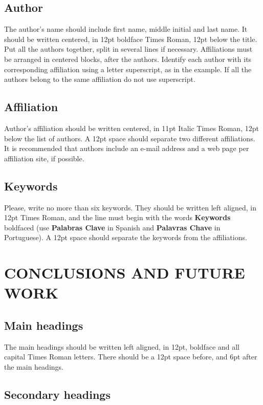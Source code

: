 \documentclass[oneside,a4paper,english,links]{amca}
\begin{document}
\subsection{Author}

The author's name should include first name, middle initial and last
name. It should be written centered, in 12pt boldface Times Roman,
12pt below the title. Put all the authors together, split in several
lines if necessary. Affiliations must be arranged in centered blocks,
after the authors. Identify each author with its corresponding
affiliation using a letter superscript, as in the example. If all the
authors belong to the same affiliation do not use superscript. 

\subsection{Affiliation}

Author's affiliation should be written centered, in 11pt Italic Times Roman,
12pt below the list of authors. A 12pt space should separate two
different affiliations. It is recommended that authors include an
e-mail address and a web page per affiliation site, if possible. 

\subsection{Keywords}

Please, write no more than six keywords.  They should be written left
aligned, in 12pt Times Roman, and the line must begin with the words
{\bf Keywords} boldfaced (use {\bf Palabras Clave} in Spanish and {\bf
Palavras Chave} in Portuguese). A 12pt space should separate the
keywords from the affiliations.

\section{CONCLUSIONS AND FUTURE WORK}

\subsection{Main headings}

The main headings should be written left aligned, in 12pt, boldface
and all capital Times Roman letters. There should be a 12pt space
before, and 6pt after the main headings.

\subsection{Secondary headings}
\end{document}
